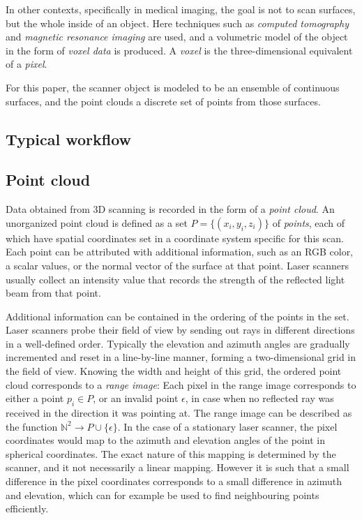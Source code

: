 In other contexts, specifically in medical imaging, the goal is not to scan surfaces, but the whole inside of an object. Here techniques such as \emph{computed tomography} and \emph{magnetic resonance imaging} are used, and a volumetric model of the object in the form of \emph{voxel data} is produced. A \emph{voxel} is the three-dimensional equivalent of a \emph{pixel}.

For this paper, the scanner object is modeled to be an ensemble of continuous surfaces, and the point clouds a discrete set of points from those surfaces. 


\subsection{Typical workflow}


\subsection{Point cloud}
Data obtained from 3D scanning is recorded in the form of a \emph{point cloud}. An unorganized point cloud is defined as a set $P = \{ (x_i, y_i, z_i) \}$ of \emph{points}, each of which have spatial coordinates set in a coordinate system specific for this scan. Each point can be attributed with additional information, such as an RGB color, a scalar values, or the normal vector of the surface at that point. Laser scanners usually collect an intensity value that records the strength of the reflected light beam from that point.

Additional information can be contained in the ordering of the points in the set. Laser scanners probe their field of view by sending out rays in different directions in a well-defined order. Typically the elevation and azimuth angles are gradually incremented and reset in a line-by-line manner, forming a two-dimensional grid in the field of view. Knowing the width and height of this grid, the ordered point cloud corresponds to a \emph{range image}: Each pixel in the range image corresponds to either a point $p_i \in P$, or an invalid point $\epsilon$, in case when no reflected ray was received in the direction it was pointing at. The range image can be described as the function $\mathbb{N}^2 \rightarrow P \cup \{ \epsilon \}$. In the case of a stationary laser scanner, the pixel coordinates would map to the azimuth and elevation angles of the point in spherical coordinates. The exact nature of this mapping is determined by the scanner, and it not necessarily a linear mapping. However it is such that a small difference in the pixel coordinates corresponds to a small difference in azimuth and elevation, which can for example be used to find neighbouring points efficiently.

